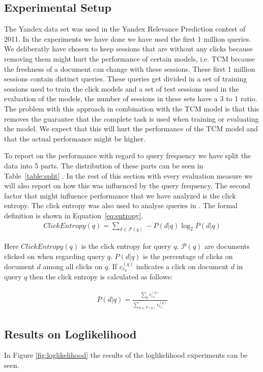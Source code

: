 \subsection{Experimental Setup}
The Yandex data set was used in the Yandex Relevance Prediction contest of 2011. In the experiments we have done we have used the first 1 million queries. We deliberatly have chosen to keep sessions that are without any clicks because removing them might hurt the performance of certain models, i.e. TCM because the freshness of a document can change with these sessions. These first 1 million sessions contain  distinct queries. These queries get divided in a set of training sessions used to train the click models and a set of test sessions used in the evaluation of the models, the number of sessions in these sets have a 3 to 1 ratio. The problem with this approach in combination with the TCM model is that this removes the guarantee that the complete task is used when training or evaluating the model. We expect that this will hurt the performance of the TCM model and that the actual performance might be higher. 

To report on the performance with regard to query frequency we have split the data into 5 parts. The distribution of these parts can be seen in Table~\ref{table:split} . In the rest of this section with every evaluation measure we will also report on how this was influenced by the query frequency. The second factor that might influence performance that we have analyzed is the click entropy. The click entropy was also used to analyse queries in \cite{dou2008}. The formal definition is shown in Equation~\ref{eq:entropy}.
\begin{align}
	ClickEntropy(q) = \sum_{d \in \mathcal{P}(q)} - P(d|q) \log_2 P(d|q)
\end{align}

Here $ClickEntropy(q)$ is the click entropy for query $q$. $\mathcal{P}(q)$ are documents clicked on when regarding query $q$. $P(d|q)$ is the percentage of clicks on document $d$ among all clicks on $q$. If $c_{r_d}^{(q)}$ indicates a click on document $d$ in query $q$ then the click entropy is calculated as follows:

\begin{align}
	P(d|q) = \frac{\sum_p c_{r_d}^{(q)}}{\sum_{u \in \mathcal{P}(q)} c_{r_u}^{(q)}}	
\end{align}

\subsection{Results on Loglikelihood}
In Figure \ref{fig:loglikelihood} the results of the loglikelihood experiments can be seen. 

